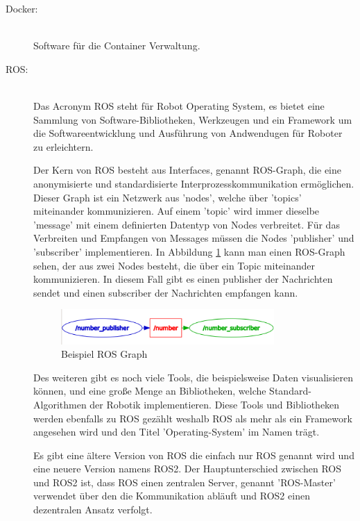 \begin{flushleft}
    \begin{description}
        \item[Docker:]\hfill\\
        Software für die Container Verwaltung.

        \item[ROS:]\hfill\\
        Das Acronym ROS steht für Robot Operating System, es bietet eine Sammlung von Software-Bibliotheken, Werkzeugen und ein Framework um die Softwareentwicklung und Ausführung von Andwendugen für Roboter zu erleichtern.

        Der Kern von ROS besteht aus Interfaces, genannt ROS-Graph, die eine anonymisierte und standardisierte Interprozesskommunikation ermöglichen.
        Dieser Graph ist ein Netzwerk aus 'nodes', welche über 'topics' miteinander kommunizieren.
        Auf einem 'topic' wird immer dieselbe 'message' mit einem definierten Datentyp von Nodes verbreitet. 
        Für das Verbreiten und Empfangen von Messages müssen die Nodes 'publisher' und 'subscriber' implementieren.
        In Abbildung \ref{fig:ros_graph} kann man einen ROS-Graph sehen, der aus zwei Nodes besteht, die über ein Topic miteinander kommunizieren.
        In diesem Fall gibt es einen publisher der Nachrichten sendet und einen subscriber der Nachrichten empfangen kann.

        \begin{figure}[h!]
            \centering
            \includegraphics[width=0.8\textwidth]{imgs/Grundbegriffe/graph_2_nodes_with_topic.png}
            \caption{Beispiel ROS Graph}
            \label{fig:ros_graph}%
        \end{figure}

        Des weiteren gibt es noch viele Tools, die beispielsweise Daten visualisieren können, und eine große Menge an Bibliotheken, welche Standard-Algorithmen der Robotik implementieren.
        Diese Tools und Bibliotheken werden ebenfalls zu ROS gezählt weshalb ROS als mehr als ein Framework angesehen wird und den Titel 'Operating-System' im Namen trägt.

        Es gibt eine ältere Version von ROS die einfach nur ROS genannt wird und eine neuere Version namens ROS2.
        Der Hauptunterschied zwischen ROS und ROS2 ist, dass ROS einen zentralen Server, genannt 'ROS-Master' verwendet über den die Kommunikation abläuft und ROS2 einen dezentralen Ansatz verfolgt.
        

\end{description}
\end{flushleft}
